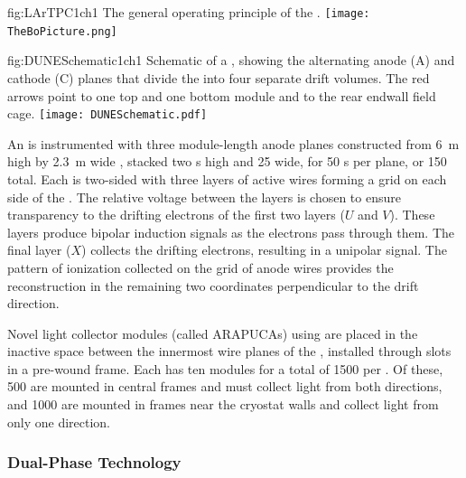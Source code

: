 \begin{dunefigure}{fig:LArTPC1ch1}
{The general operating principle of the  .}
\texttt{[image: TheBoPicture.png]} 
\end{dunefigure}

\begin{dunefigure}{fig:DUNESchematic1ch1}
{Schematic of a \nominalmodsize {}  , showing the alternating anode (A) and cathode (C) planes that divide the  into four separate drift volumes. The red arrows point to one top and one bottom  module and to the rear endwall field cage.}
\texttt{[image: DUNESchematic.pdf]}
\end{dunefigure}

An  is instrumented with three module-length anode planes constructed from \SI{6}{m} high by \SI{2.3}{m} wide , stacked two s high and 25 wide, for 50 s per plane, or 150 total. Each  is two-sided with three layers of active wires forming a grid on each side of the . The relative voltage between the layers is chosen to ensure transparency to the drifting electrons of the first two layers ($U$ and $V$). These layers produce bipolar induction signals as the electrons pass through them. The final layer ($X$) collects the drifting electrons, resulting in a unipolar signal. The pattern of ionization collected on the grid of anode wires provides the reconstruction in the remaining two coordinates perpendicular to the drift direction.



Novel  light collector modules (called ARAPUCAs) using  are placed in the inactive space between the innermost wire planes of the , installed through slots in a pre-wound  frame. 
Each  has ten  modules for a total of \num{1500} per .  Of these, \num{500} are mounted in central  frames and must collect light from both directions, 
and \num{1000} are mounted in frames  near the %
cryostat walls and collect light from only one direction. 

\FloatBarrier
\subsubsection{Dual-Phase Technology}
\label{sec:fddp-exec-splar}

